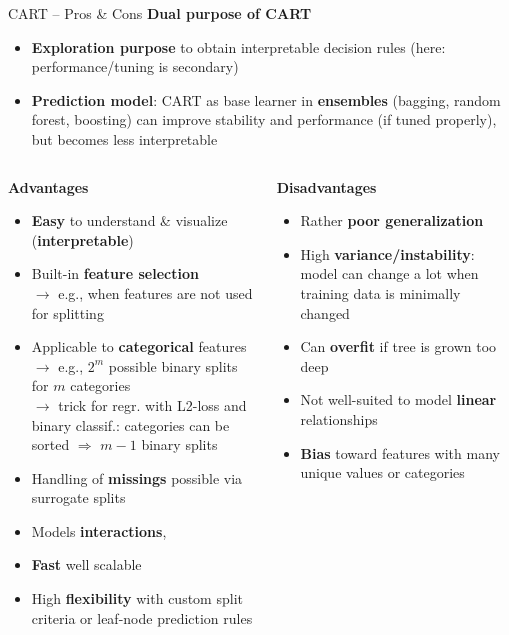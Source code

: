 \documentclass[11pt,compress,t,notes=noshow, xcolor=table]{beamer}
\newcommand{\highlight}[1]{\textcolor{hlcol}{\textbf{#1}}}
\newcommand{\positem}{\item[\textcolor{hlcol}{$\bm{+}$}]}
\newcommand{\negitem}{\item[\textcolor{hlcol}{$\bm{-}$}]}
\begin{document}
\begin{frame2}{CART -- Pros \& Cons}
  \highlight{Dual purpose of CART} ~~ 
\begin{itemize}
    \item \textbf{Exploration purpose} to obtain interpretable decision rules (here: performance/tuning is secondary)
    \item \textbf{Prediction model}: CART as base learner in \textbf{ensembles} (bagging, random forest, boosting) can improve stability and performance (if tuned properly), but becomes less interpretable
\end{itemize}

\framebreak

\medskip
\begin{columns}[onlytextwidth]
  \begin{column}{0.5\textwidth}
    \highlight{Advantages}
    \footnotesize
    \begin{itemize}
      \positem \textbf{Easy} to understand \& visualize (\textbf{interpretable})
      \positem Built-in \textbf{feature selection}\\
      $\rightarrow$ e.g., when features are not used for splitting
      \positem Applicable to \textbf{categorical} features \\
      $\rightarrow$ e.g., $2^m$ possible binary splits for $m$ categories\\
       $\rightarrow$ trick for regr. with L2-loss and binary classif.: categories can be sorted $\Rightarrow$ $m-1$ binary splits 
      \positem Handling of \textbf{missings} possible via surrogate splits
      \positem Models  \textbf{interactions}, 
      \positem \textbf{Fast} well scalable
      \positem High \textbf{flexibility} with custom split criteria or leaf-node 
      prediction rules
    \end{itemize}
  \end{column}
  \begin{column}{0.5\textwidth}
    \highlight{Disadvantages}
    \footnotesize
    \begin{itemize}
      \negitem Rather \textbf{poor generalization} %
      \negitem High \textbf{variance/instability}: model can change a lot when training data is minimally changed
      \negitem Can \textbf{overfit} if tree is grown too deep
      \negitem Not well-suited to model \textbf{linear} relationships
      \negitem \textbf{Bias} toward features with many unique values or categories
    \end{itemize}
  \end{column}
\end{columns}
\end{frame2}
\end{document}
